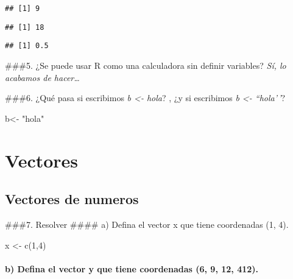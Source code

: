 \documentclass[
]{article}
\newenvironment{Shaded}{\begin{snugshade}}{\end{snugshade}}
\newcommand{\DecValTok}[1]{\textcolor[rgb]{0.00,0.00,0.81}{#1}}
\newcommand{\FunctionTok}[1]{\textcolor[rgb]{0.00,0.00,0.00}{#1}}
\newcommand{\NormalTok}[1]{#1}
\newcommand{\OtherTok}[1]{\textcolor[rgb]{0.56,0.35,0.01}{#1}}
\newcommand{\StringTok}[1]{\textcolor[rgb]{0.31,0.60,0.02}{#1}}
\begin{document}
\begin{verbatim}
## [1] 9
\end{verbatim}

\begin{verbatim}
## [1] 18
\end{verbatim}

\begin{verbatim}
## [1] 0.5
\end{verbatim}

\#\#\#5. ¿Se puede usar R como una calculadora sin definir variables?
\emph{Sí, lo acabamos de hacer\ldots{}}

\#\#\#6. ¿Qué pasa si escribimos \emph{b \textless- hola}? , ¿y si
escribimos \emph{b \textless- ``hola'\,'}?

\begin{Shaded}
\begin{Highlighting}[]
\NormalTok{b}\OtherTok{\textless{}{-}} \StringTok{"hola"}
\end{Highlighting}
\end{Shaded}

\hypertarget{vectores}{%
\section{\texorpdfstring{\textbf{Vectores}}{Vectores}}\label{vectores}}

\hypertarget{vectores-de-numeros}{%
\subsection{\texorpdfstring{\textbf{Vectores de
numeros}}{Vectores de numeros}}\label{vectores-de-numeros}}

\#\#\#7. Resolver \#\#\#\# a) Defina el vector x que tiene coordenadas
(1, 4).

\begin{Shaded}
\begin{Highlighting}[]
\NormalTok{x }\OtherTok{\textless{}{-}} \FunctionTok{c}\NormalTok{(}\DecValTok{1}\NormalTok{,}\DecValTok{4}\NormalTok{)}
\end{Highlighting}
\end{Shaded}

\hypertarget{b-defina-el-vector-y-que-tiene-coordenadas-6-9-12-412.}{%
\paragraph{b) Defina el vector y que tiene coordenadas (6, 9, 12,
412).}\label{b-defina-el-vector-y-que-tiene-coordenadas-6-9-12-412.}}
\end{document}
